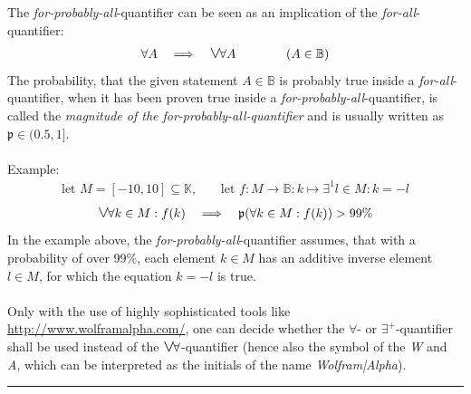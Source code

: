\documentclass[pdftex,12pt,a4paper]{report}
\newcommand{\fpa}{\hbox{\fontsize{13.3pt}{15pt}\selectfont $ \vee $} \hspace{-1.2pt} \forall}
\begin{document}
    The \emph{for-probably-all}-quantifier can be seen as an implication of the \emph{for-all}-quantifier:
    \begin{equation*}
        \begin{aligned}
            \forall A \quad \Longrightarrow \quad \fpa A \qquad \qquad (A \in \mathbb{B})
        \end{aligned}
    \end{equation*}
    The probability, that the given statement $ A \in \mathbb{B} $ is probably true inside a \emph{for-all}-quantifier, when it has been proven true inside a \emph{for-probably-all}-quantifier, is called the \textit{magnitude of the for-probably-all-quantifier} and is usually written as $ \mathfrak{p} \in (0.5,1] $. \\ \\
    Example:
    \begin{equation*}
        \begin{aligned}
            \text{let } M = [-10, 10] \subseteq \mathbb{K} \text{,} \qquad \text{let } f : M \rightarrow \mathbb{B} : k \mapsto \exists^1 l \in M : k = -l
        \end{aligned}
    \end{equation*}
    \begin{equation*}
        \begin{aligned}
            \fpa k \in M : f(k) \quad \Longrightarrow \quad \mathfrak{p}(\forall k \in M : f(k)) > 99\%
        \end{aligned}
    \end{equation*}
    In the example above, the \emph{for-probably-all}-quantifier assumes, that with a probability of over 99\%, each element $ k \in M $ has an additive inverse element $ l \in M $, for which the equation $ k = -l $ is true.
    \\ \\
    Only with the use of highly sophisticated tools like \url{http://www.wolframalpha.com/}, one can decide whether the $ \forall $- or $ \exists^+ $-quantifier shall be used instead of the $ \fpa $-quantifier (hence also the symbol of the \emph{W} and \emph{A}, which can be interpreted as the initials of the name \emph{Wolfram|Alpha}).
    \vspace{5mm} \hrule
\end{document}
